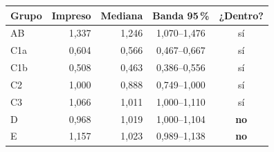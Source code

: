 \begin{tabular}{lrrcc}\toprule
Grupo & Impreso & Mediana & Banda 95\,\% & ¿Dentro? \\\midrule
AB & 1,337 & 1,246 & 1,070--1,476 & sí \\
C1a & 0,604 & 0,566 & 0,467--0,667 & sí \\
C1b & 0,508 & 0,463 & 0,386--0,556 & sí \\
C2 & 1,000 & 0,888 & 0,749--1,000 & sí \\
C3 & 1,066 & 1,011 & 1,000--1,110 & sí \\
D & 0,968 & 1,019 & 1,000--1,104 & \textbf{no} \\
E & 1,157 & 1,023 & 0,989--1,138 & \textbf{no} \\
\bottomrule\end{tabular}
